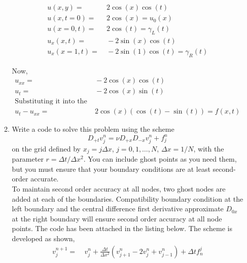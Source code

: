 \documentclass[11pt]{article}
\newcommand{\Dpt}{D_{+t}}
\newcommand{\Dpx}{D_{+x}}
\newcommand{\Dmx}{D_{-x}}
\newcommand{\Dzx}{D_{0x}}
\newcommand{\dx}{\Delta x}
\newcommand{\dt}{\Delta t}
\newcommand{\vnpj}{v^{n+1}_j}
\newcommand{\vnjp}{v^n_{j+1}}
\newcommand{\vnjm}{v^n_{j-1}}
\newcommand{\vnj}{v^n_j}
\begin{document}
\begin{enumerate}
\begin{enumerate}
    \begin{align*}
    u(x,y) = & \ 2\cos(x)\cos(t) \\
    u(x,t=0) = & \ 2\cos(x) = u_0(x) \\
    u(x=0,t) = & \ 2\cos(t) = \gamma_L(t) \\
    u_x(x,t) = & \ -2\sin(x)\cos(t) \\
    u_x(x=1,t) = & \ -2\sin(1)\cos(t) = \gamma_R(t) 
    \end{align*}
    
    Now, 
    \begin{align*}
    u_{xx} = & \ -2\cos(x)\cos(t) \\
    u_t = & \ -2\cos(x)\sin(t) \\
    \text{Substituting it into the PDE, } \\
    u_t - u_{xx} = & \ 2\cos(x)\left(\cos(t) - \sin(t)\right) = f(x,t)
    \end{align*}
    
    \item {\color{blue}Write a code to solve this problem using the scheme}
      \[
        \Dpt v_j^n = \nu\Dpx\Dmx v_j^n+f_j^n
      \]
      {\color{blue}on the grid defined by} $x_j=j\dx$, $j=0,1,\ldots,N$, $\dx=1/N$, {\color{blue}with the parameter }$r=\Delta t/\Delta x^2$. {\color{blue}You can include ghost points as you need them, but you must ensure that your boundary conditions are at least second-order accurate.} \\
      
      To maintain second order accuracy at all nodes, two ghost nodes are added at each of the boundaries. Compatibility boundary condition at the left boundary and the central difference first derivative approximate $\Dzx$ at the right boundary will ensure second order accuracy at all node points. The code has been attached in the listing below. The scheme is developed as shown,
      \begin{align*}
      \vnpj = & \ \vnj + \frac{\dt}{\dx^2}\left(\vnjp -2\vnj + \vnjm \right) + \dt f_n^j
      \end{align*}
      

\end{enumerate}
\end{enumerate}
\end{document}
